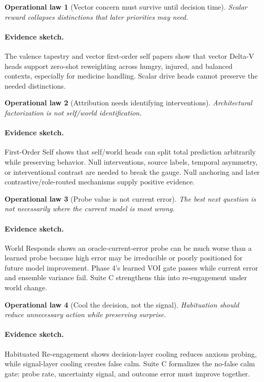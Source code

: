 \documentclass[11pt]{article}
\newtheorem{law}{Operational law}
\newenvironment{proofsketch}{\paragraph{Evidence sketch.}}{}
\begin{document}
\begin{law}[Vector concern must survive until decision time]
Scalar reward collapses distinctions that later priorities may need.
\end{law}
\begin{proofsketch}
The valence tapestry and vector first-order self papers show that vector
Delta-V heads support zero-shot reweighting across hungry, injured, and
balanced contexts, especially for medicine handling. Scalar drive heads cannot
preserve the needed distinctions.
\end{proofsketch}

\begin{law}[Attribution needs identifying interventions]
Architectural factorization is not self/world identification.
\end{law}
\begin{proofsketch}
First-Order Self shows that self/world heads can split total prediction
arbitrarily while preserving behavior. Null interventions, source labels,
temporal asymmetry, or interventional contrast are needed to break the gauge.
Null anchoring and later contrastive/role-routed mechanisms supply positive
evidence.
\end{proofsketch}

\begin{law}[Probe value is not current error]
The best next question is not necessarily where the current model is most
wrong.
\end{law}
\begin{proofsketch}
World Responds shows an oracle-current-error probe can be much worse than a
learned probe because high error may be irreducible or poorly positioned for
future model improvement. Phase 4's learned VOI gate passes while current error
and ensemble variance fail. Suite C strengthens this into re-engagement under
world change.
\end{proofsketch}

\begin{law}[Cool the decision, not the signal]
Habituation should reduce unnecessary action while preserving surprise.
\end{law}
\begin{proofsketch}
Habituated Re-engagement shows decision-layer cooling reduces anxious probing,
while signal-layer cooling creates false calm. Suite C formalizes the no-false
calm gate: probe rate, uncertainty signal, and outcome error must improve
together.
\end{proofsketch}
\end{document}

